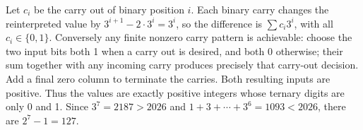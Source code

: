 Let $c_i$ be the carry out of binary position $i$. Each binary carry changes the reinterpreted value by $3^{i+1}-2\cdot3^i=3^i$, so the difference is $\sum c_i3^i$, with all $c_i\in\{0,1\}$. Conversely any finite nonzero carry pattern is achievable: choose the two input bits both 1 when a carry out is desired, and both 0 otherwise; their sum together with any incoming carry produces precisely that carry-out decision. Add a final zero column to terminate the carries. Both resulting inputs are positive. Thus the values are exactly positive integers whose ternary digits are only 0 and 1. Since $3^7=2187>2026$ and $1+3+\cdots+3^6=1093<2026$, there are $2^7-1=\boxed{127}$.
